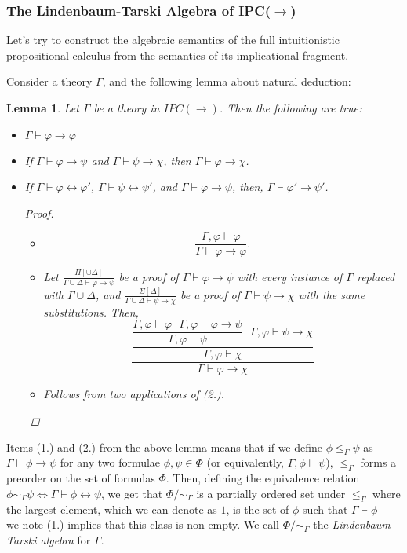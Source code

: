 \documentclass[12pt]{article}
\renewcommand{\leq}{\leqslant}
\newtheorem{lemma}[theorem]{Lemma}
\begin{document}
\subsubsection{The Lindenbaum-Tarski Algebra of IPC($\to$)}
Let's try to construct the algebraic semantics of the full intuitionistic propositional calculus from the semantics of its implicational fragment.

Consider a theory $\Gamma$, and the following lemma about natural deduction:
\begin{lemma}
Let $\Gamma$ be a theory in $IPC(\to)$. Then the following are true:
\begin{itemize}
\item[1.] $\Gamma\vdash \varphi\to\varphi$
\item[2.] If $\Gamma\vdash \varphi\to\psi$ and $\Gamma\vdash \psi\to\chi$, then $\Gamma\vdash\varphi\to\chi$.
\item[3.] If $\Gamma\vdash \varphi\leftrightarrow\varphi'$, $\Gamma\vdash\psi\leftrightarrow\psi'$, and $\Gamma\vdash\varphi\to\psi$, 
then, $\Gamma\vdash\varphi'\to\psi'$. 
\begin{proof}
\begin{itemize}
\item[1.] $$\dfrac{\Gamma,\varphi\vdash\varphi}{\Gamma\vdash\varphi\to\varphi}.$$
\item[2.] Let $\frac{\Pi[\cup\Delta]}{\Gamma\cup\Delta\vdash \varphi\to\psi}$ be a proof of $\Gamma\vdash\varphi\to\psi$
with every instance of $\Gamma$ replaced with $\Gamma\cup\Delta$, 
and $\frac{\Sigma[\Delta]}{\Gamma\cup\Delta\vdash \psi\to\chi}$ be a proof of $\Gamma\vdash \psi\to\chi$ 
with the same substitutions.  
Then, 
$$
\dfrac{
\dfrac{
  \dfrac{\Gamma,\varphi\vdash\varphi\text{ } \Gamma,\varphi\vdash \varphi\to\psi}{\Gamma,\varphi\vdash\psi}\text{ }
  \Gamma,\varphi\vdash\psi\to\chi
  }
  {
  \Gamma,\varphi\vdash\chi
  }
}
{
  \Gamma\vdash\varphi\to\chi
}
$$
\item[3.] Follows from two applications of (2.).
\end{itemize}
\end{proof}
\end{itemize}
\end{lemma} 
Items (1.) and (2.) from the above lemma means that if we define $\phi\leq_\Gamma \psi$ as $\Gamma\vdash \phi\to\psi$ 
for any two formulae $\phi,\psi\in\Phi$ 
(or equivalently, $\Gamma,\phi\vdash\psi$), 
$\leq_\Gamma$ forms a preorder on the set of formulas $\Phi$. 
Then, defining the equivalence relation $\phi\sim_\Gamma\psi\iff\Gamma\vdash\phi\leftrightarrow\psi$,
we get that $\Phi/\sim_\Gamma$ is a partially ordered set under $\leq_\Gamma$ 
where the largest element, which we can denote as $1$, is the set of $\phi$ such that $\Gamma\vdash\phi$---
we note (1.) implies that this class is non-empty.  
We call $\Phi/\sim_\Gamma$ the \textit{Lindenbaum-Tarski algebra} for $\Gamma$. 
\end{document}
